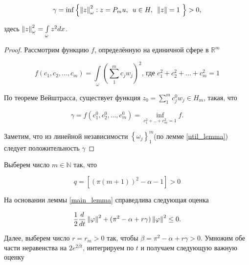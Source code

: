 \begin{lemma}\label{main_lemma}
    \begin{equation}
        \gamma = \inf{ \left\{ \left\lVert z\right\rVert^2_{\omega} : z = P_mu,\enskip u \in H, 
        \enskip \left\lVert z\right\rVert = 1 \ \right\} } > 0,
    \end{equation}

    \par здесь $\left\lVert z\right\rVert^2_{\omega} = \int\limits_{\omega}{z^2dx}$.
\end{lemma}

\begin{proof}

    Рассмотрим функцию $f$, определённую на единичной сфере в $\mathbb{R}^m$

    \begin{equation}
       f(c_1, c_2, ..., c_m) = \int \limits_{\omega} {(\sum\limits_1^m {c_jw_j})^2}
       \text{, где } c_1^2 + c_2^2 + ... + c^2_m = 1
    \end{equation}

    По теореме Вейштрасса, существует функция 
    $z_0 = \sum\limits_1^m {c_j^0 w_j} \in H_m$, такая, что

    \begin{equation}
       \gamma = f(c_1^0, c_2^0, ..., c_m^0) = \inf \limits_{c_1^2 + .. + c_m^2 =
       1} {f}.
    \end{equation}

    Заметим, что из линейной независимости 
    $\left\{ \omega_j \right\}^m_1$(по лемме \ref{util_lemma}) следует 
    положительность $\gamma$

\end{proof}

\par
\vspace{2ex}

Выберем число $m \in \mathbb{N}$ так, что

\begin{equation}
    q = [(\pi(m + 1))^2 - \alpha - 1] > 0
\end{equation}

На основании леммы \ref{main_lemma} справедлива следующая оценка

\begin{equation*}
    \frac{1}{2} \frac{d}{dt} \left\lVert\varphi\right\rVert^2 + (\pi^2 - \alpha + r\gamma) 
    \left\lVert\varphi\right\rVert^2 \le 0.
\end{equation*}

Далее, выберем число $r = r_m > 0$ так, чтобы
$\beta = \pi^2 - \alpha + r\gamma > 0$.
Умножим обе части неравенства на $2e^{2\beta t}$, интегрируем по $t$ и 
получаем следующую важную оценку

